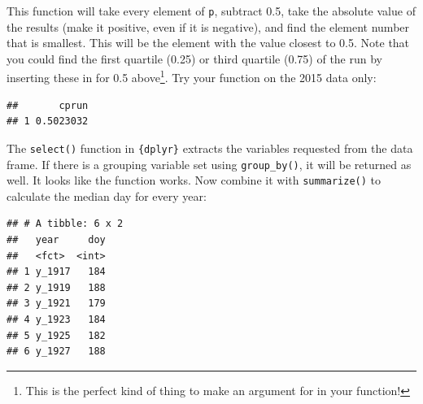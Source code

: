 \documentclass[]{book}
\newenvironment{Shaded}{\begin{snugshade}}{\end{snugshade}}
\newcommand{\CommentTok}[1]{\textcolor[rgb]{0.56,0.35,0.01}{\textit{#1}}}
\newcommand{\DataTypeTok}[1]{\textcolor[rgb]{0.13,0.29,0.53}{#1}}
\newcommand{\KeywordTok}[1]{\textcolor[rgb]{0.13,0.29,0.53}{\textbf{#1}}}
\newcommand{\NormalTok}[1]{#1}
\newcommand{\OperatorTok}[1]{\textcolor[rgb]{0.81,0.36,0.00}{\textbf{#1}}}
\newcommand{\StringTok}[1]{\textcolor[rgb]{0.31,0.60,0.02}{#1}}
\let\rmarkdownfootnote\footnote%
\def\footnote{\protect\rmarkdownfootnote}
\begin{document}
This function will take every element of \texttt{p}, subtract 0.5, take the absolute value of the results (make it positive, even if it is negative), and find the element number that is smallest. This will be the element with the value closest to 0.5. Note that you could find the first quartile (0.25) or third quartile (0.75) of the run by inserting these in for 0.5 above\footnote{This is the perfect kind of thing to make an argument for in your function!}. Try your function on the 2015 data only:

\begin{Shaded}
\end{Shaded}

\begin{verbatim}
##       cprun
## 1 0.5023032
\end{verbatim}

The \texttt{select()} function in \texttt{\{dplyr\}} extracts the variables requested from the data frame. If there is a grouping variable set using \texttt{group\_by()}, it will be returned as well. It looks like the function works. Now combine it with \texttt{summarize()} to calculate the median day for every year:

\begin{Shaded}
\end{Shaded}

\begin{verbatim}
## # A tibble: 6 x 2
##   year     doy
##   <fct>  <int>
## 1 y_1917   184
## 2 y_1919   188
## 3 y_1921   179
## 4 y_1923   184
## 5 y_1925   182
## 6 y_1927   188
\end{verbatim}
\end{document}
